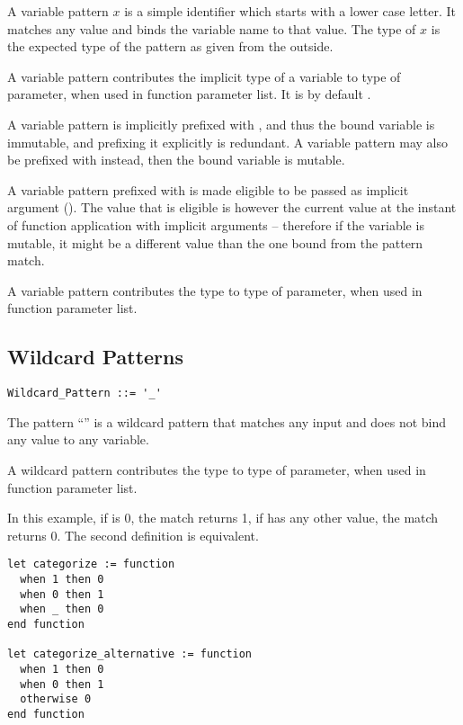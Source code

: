 A variable pattern $x$ is a simple identifier which starts with a lower case letter. It matches any value and binds the variable name to that value. The type of $x$ is the expected type of the pattern as given from the outside. 

A variable pattern contributes the implicit type of a variable to type of parameter, when used in function parameter list. It is by default . 

A variable pattern is implicitly prefixed with , and thus the bound variable is immutable, and prefixing it explicitly is redundant. A variable pattern may also be prefixed with  instead, then the bound variable is mutable. 

A variable pattern prefixed with  is made eligible to be passed as implicit argument (). The value that is eligible is however the current value at the instant of function application with implicit arguments -- therefore if the variable is mutable, it might be a different value than the one bound from the pattern match. 

A variable pattern contributes the type  to type of parameter, when used in function parameter list. 






\subsection{Wildcard Patterns}
\label{sec:wildcard-patterns}

\syntax\begin{lstlisting}
Wildcard_Pattern ::= '_'
\end{lstlisting}

The pattern ``\code{_}'' is a wildcard pattern that matches any input and does not bind any value to any variable. 

A wildcard pattern contributes the type  to type of parameter, when used in function parameter list. 

\example In this example, if  is 0, the match returns 1, if  has any other value, the match returns 0. The second definition is equivalent. 
\begin{lstlisting}
let categorize := function
  when 1 then 0
  when 0 then 1
  when _ then 0
end function

let categorize_alternative := function
  when 1 then 0
  when 0 then 1
  otherwise 0
end function
\end{lstlisting}

